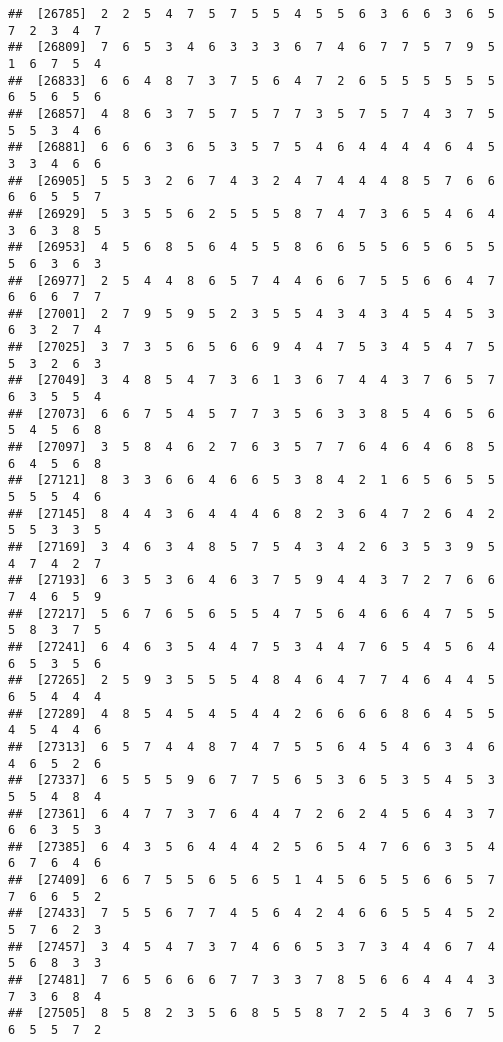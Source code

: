 \documentclass[
]{book}
\begin{document}
\begin{verbatim}
##  [26785]  2  2  5  4  7  5  7  5  5  4  5  5  6  3  6  6  3  6  5  7  2  3  4  7
##  [26809]  7  6  5  3  4  6  3  3  3  6  7  4  6  7  7  5  7  9  5  1  6  7  5  4
##  [26833]  6  6  4  8  7  3  7  5  6  4  7  2  6  5  5  5  5  5  5  6  5  6  5  6
##  [26857]  4  8  6  3  7  5  7  5  7  7  3  5  7  5  7  4  3  7  5  5  5  3  4  6
##  [26881]  6  6  6  3  6  5  3  5  7  5  4  6  4  4  4  4  6  4  5  3  3  4  6  6
##  [26905]  5  5  3  2  6  7  4  3  2  4  7  4  4  4  8  5  7  6  6  6  6  5  5  7
##  [26929]  5  3  5  5  6  2  5  5  5  8  7  4  7  3  6  5  4  6  4  3  6  3  8  5
##  [26953]  4  5  6  8  5  6  4  5  5  8  6  6  5  5  6  5  6  5  5  5  6  3  6  3
##  [26977]  2  5  4  4  8  6  5  7  4  4  6  6  7  5  5  6  6  4  7  6  6  6  7  7
##  [27001]  2  7  9  5  9  5  2  3  5  5  4  3  4  3  4  5  4  5  3  6  3  2  7  4
##  [27025]  3  7  3  5  6  5  6  6  9  4  4  7  5  3  4  5  4  7  5  5  3  2  6  3
##  [27049]  3  4  8  5  4  7  3  6  1  3  6  7  4  4  3  7  6  5  7  6  3  5  5  4
##  [27073]  6  6  7  5  4  5  7  7  3  5  6  3  3  8  5  4  6  5  6  5  4  5  6  8
##  [27097]  3  5  8  4  6  2  7  6  3  5  7  7  6  4  6  4  6  8  5  6  4  5  6  8
##  [27121]  8  3  3  6  6  4  6  6  5  3  8  4  2  1  6  5  6  5  5  5  5  5  4  6
##  [27145]  8  4  4  3  6  4  4  4  6  8  2  3  6  4  7  2  6  4  2  5  5  3  3  5
##  [27169]  3  4  6  3  4  8  5  7  5  4  3  4  2  6  3  5  3  9  5  4  7  4  2  7
##  [27193]  6  3  5  3  6  4  6  3  7  5  9  4  4  3  7  2  7  6  6  7  4  6  5  9
##  [27217]  5  6  7  6  5  6  5  5  4  7  5  6  4  6  6  4  7  5  5  5  8  3  7  5
##  [27241]  6  4  6  3  5  4  4  7  5  3  4  4  7  6  5  4  5  6  4  6  5  3  5  6
##  [27265]  2  5  9  3  5  5  5  4  8  4  6  4  7  7  4  6  4  4  5  6  5  4  4  4
##  [27289]  4  8  5  4  5  4  5  4  4  2  6  6  6  6  8  6  4  5  5  4  5  4  4  6
##  [27313]  6  5  7  4  4  8  7  4  7  5  5  6  4  5  4  6  3  4  6  4  6  5  2  6
##  [27337]  6  5  5  5  9  6  7  7  5  6  5  3  6  5  3  5  4  5  3  5  5  4  8  4
##  [27361]  6  4  7  7  3  7  6  4  4  7  2  6  2  4  5  6  4  3  7  6  6  3  5  3
##  [27385]  6  4  3  5  6  4  4  4  2  5  6  5  4  7  6  6  3  5  4  6  7  6  4  6
##  [27409]  6  6  7  5  5  6  5  6  5  1  4  5  6  5  5  6  6  5  7  7  6  6  5  2
##  [27433]  7  5  5  6  7  7  4  5  6  4  2  4  6  6  5  5  4  5  2  5  7  6  2  3
##  [27457]  3  4  5  4  7  3  7  4  6  6  5  3  7  3  4  4  6  7  4  5  6  8  3  3
##  [27481]  7  6  5  6  6  6  7  7  3  3  7  8  5  6  6  4  4  4  3  7  3  6  8  4
##  [27505]  8  5  8  2  3  5  6  8  5  5  8  7  2  5  4  3  6  7  5  6  5  5  7  2

\end{verbatim}
\end{document}
